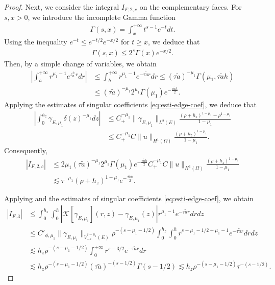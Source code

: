 ﻿\documentclass[11pt,reqno,oneside]{amsart}
\theoremstyle{definition}
\theoremstyle{remark}
\renewcommand{\d}{\delta}
\newcommand{\g}{\gamma}
\newcommand{\ds}{\displaystyle}
\begin{document}
\begin{proof}
            Next, we consider the integral $I_{F,2,c}$ on the complementary faces. For $s,x >0$, we introduce the incomplete Gamma function
            \begin{align*}
                \Gamma(s,x)=\int_x^{+\infty} t^{s-1} e^{-t} dt.
            \end{align*}
            Using the inequality $\ds e^{-t}\leq e^{-t/2}e^{-x/2}$ for $t\geq x$, we deduce that
            \begin{align*}
                \Gamma(s,x)\leq 2^s \Gamma(x) e^{-x/2}.
            \end{align*}
            Then, by a simple change of variables, we obtain
            \begin{align*}
                \left|\int_h^{+\infty} r^{\mu_1-1} e^{z_a^\pm r} dr \right|& \leq \int_h^{+\infty} r^{\mu_1-1} e^{-\tau \widetilde{a} r} dr\leq  (\tau \widetilde{a})^{-\mu_1} \Gamma(\mu_1, \tau \widetilde{a} h)\\
                &\leq (\tau \widetilde{a})^{-\mu_1} 2^{\mu_1} \Gamma(\mu_1) e^{-\frac{\tau \widetilde{a} h}{2}}.
            \end{align*}
            Applying the estimates of singular coefficients \eqref{eq:esti-edge-coef}, we deduce that
            \begin{align*}
                \left|\int_0^{h_z} \g_{E,\mu_1}\d(z)^{-\mu_1}dz \right|&\leq C_+^{-\mu_1}\|\g_{E,\mu_1}\|_{L^2(E)} \frac{(\rho+h_z)^{1-\mu_1}-\rho^{1-\mu_1}}{1-\mu_1}\\
                &\leq C_+^{-\mu_1}C\|u\|_{H^1(\Omega)}\frac{(\rho+h_z)^{1-\mu_1}}{1-\mu_1}.
            \end{align*}
            Consequently,
            \begin{align}\label{eq:esti-F2-c}
                |I_{F,2,c}|&\leq 2\mu_1 (\tau \widetilde{a})^{-\mu_1} 2^{\mu_1} \Gamma(\mu_1) e^{-\frac{\tau \widetilde{a} h}{2}} C_+^{-\mu_1}C\|u\|_{H^1(\Omega)}\frac{(\rho+h_z)^{1-\mu_1}}{1-\mu_1}\nonumber\\
                &\lesssim \tau^{-\mu_1}(\rho+h_z)^{1-\mu_1}e^{-\frac{\tau \widetilde{a} h}{2}}.
            \end{align}

            Applying  and the estimates of singular coefficients \eqref{eq:esti-edge-coef}, we obtain
            \begin{align}\label{eq:esti-F3}
                |I_{F,3}|&\leq \int_0^{h_z}\int_0^h |\mathcal{K}[\g_{E,\mu_1}](r,z)-\g_{E,\mu_1}(z)| r^{\mu_1-1} e^{-\tau \widetilde{a} r} dr dz \nonumber\\
                & \leq C'_{\phi,\mu_1} \|\g_{E,\mu_1}\|_{V_{-s}^{s-\mu_1}(E)}\rho^{-(s-\mu_1-1/2)} \int_0^{h_z}\int_0^h r^{s-\mu_1-1/2+\mu_1-1} e^{-\tau \widetilde{a} r} dr dz \nonumber\\
                &\lesssim h_z \rho^{-(s-\mu_1-1/2)} \int_0^{+\infty} r^{s-3/2} e^{-\tau\widetilde{a} r} dr \nonumber\\
                & \lesssim h_z \rho^{-(s-\mu_1-1/2)} (\tau\widetilde{a})^{-(s-1/2)}\Gamma(s-1/2)\lesssim h_z \rho^{-(s-\mu_1-1/2)} \tau^{-(s-1/2)}.
            \end{align}


\end{proof}
\end{document}
